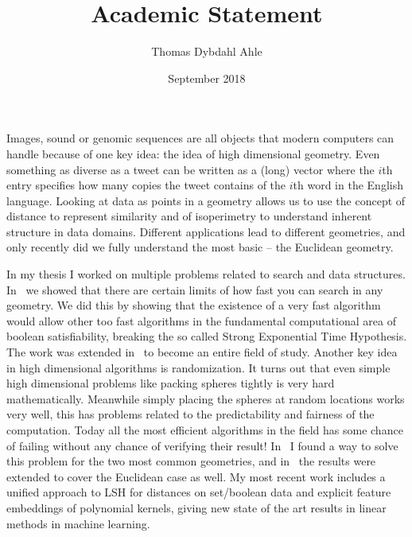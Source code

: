 \documentclass[10pt]{article}
\title{Academic Statement}
\author{Thomas Dybdahl Ahle}
\date{September 2018}
\begin{document}
\maketitle


Images, sound or genomic sequences are all objects that modern computers can handle because of one key idea: the idea of high dimensional geometry.
Even something as diverse as a tweet can be written as a (long) vector where the $i$th entry specifies how many copies the tweet contains of the $i$th word in the English language.
Looking at data as points in a geometry allows us to use the concept of distance to represent similarity and of isoperimetry to understand inherent structure in data domains.
Different applications lead to different geometries, and only recently did we fully understand the most basic -- the Euclidean geometry.


In my thesis I worked on multiple problems related to search and data structures.
In~\cite{ahle2016complexity} we showed that there are certain limits of how fast you can search in any geometry.
We did this by showing that the existence of a very fast algorithm would allow other too fast algorithms in the fundamental computational area of boolean satisfiability, breaking the so called Strong Exponential Time Hypothesis.
The work was extended in~\cite{DBLP:journals/corr/AbboudR17} to become an entire field of study.
%
Another key idea in high dimensional algorithms is randomization.
It turns out that even simple high dimensional problems like packing spheres tightly is very hard mathematically.
Meanwhile simply placing the spheres at random locations works very well,
this has problems related to the predictability and fairness of the computation.
Today all the most efficient algorithms in the field has some chance of failing without any chance of verifying their result!
In~\cite{ahle2017optimal} I found a way to solve this problem for the two most common geometries, and in~\cite{wei2018optimal} the results were extended to cover the Euclidean case as well.
%
My most recent work includes a unified approach to LSH for distances on set/boolean data and explicit feature embeddings of polynomial kernels, giving new state of the art results in linear methods in machine learning.
\end{document}
